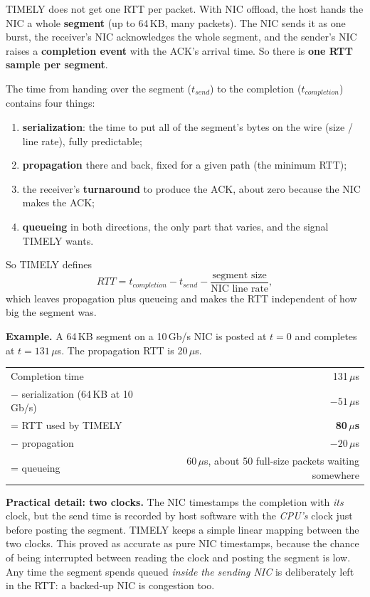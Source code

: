 TIMELY does not get one RTT per packet. With NIC offload, the host hands the NIC a whole \textbf{segment} (up to 64\,KB, many packets).
The NIC sends it as one burst, the receiver's NIC acknowledges the whole segment, and the sender's NIC raises a \textbf{completion event} with
the ACK's arrival time. So there is \textbf{one RTT sample per segment}.

The time from handing over the segment ($t_{send}$) to the completion ($t_{completion}$) contains four things:
\begin{enumerate}
  \item \textbf{serialization}: the time to put all of the segment's bytes on the wire (size / line rate), fully predictable;
  \item \textbf{propagation} there and back, fixed for a given path (the minimum RTT);
  \item the receiver's \textbf{turnaround} to produce the ACK, about zero because the NIC makes the ACK;
  \item \textbf{queueing} in both directions, the only part that varies, and the signal TIMELY wants.
\end{enumerate}
So TIMELY defines
\[
  RTT = t_{completion} - t_{send} - \frac{\text{segment size}}{\text{NIC line rate}},
\]
which leaves propagation plus queueing and makes the RTT independent of how big the segment was.

\textbf{Example.} A 64\,KB segment on a 10\,Gb/s NIC is posted at $t = 0$ and completes at $t = 131\,\mu$s. The propagation RTT is 20\,$\mu$s.
\begin{center}
\begin{tabular}{@{}lr@{}}
\toprule
Completion time & 131\,$\mu$s\\
$-$ serialization (64\,KB at 10\,Gb/s) & $-51\,\mu$s\\
= RTT used by TIMELY & \textbf{80\,$\mu$s}\\
$-$ propagation & $-20\,\mu$s\\
= queueing & 60\,$\mu$s, about 50 full-size packets waiting somewhere\\
\bottomrule
\end{tabular}
\end{center}

\textbf{Practical detail: two clocks.} The NIC timestamps the completion with \emph{its} clock, but the send time is recorded by host software
with the \emph{CPU's} clock just before posting the segment. TIMELY keeps a simple linear mapping between the two clocks. This proved as
accurate as pure NIC timestamps, because the chance of being interrupted between reading the clock and posting the segment is low. Any time
the segment spends queued \emph{inside the sending NIC} is deliberately left in the RTT: a backed-up NIC is congestion too.

